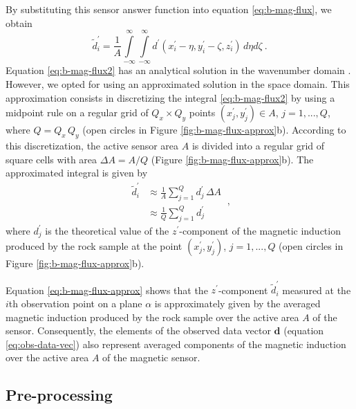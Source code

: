 \documentclass[galley,gc]{agutex}
\begin{document}
\begin{article}
\begin{equation}
\label{eq:w-function}
\end{equation}
By substituting this sensor answer function into 
equation \ref{eq:b-mag-flux}, we obtain
\begin{equation}
\tilde{d}^{\prime}_{i} = \frac{1}{A} 
\int \limits_{-\infty}^{\infty} \int \limits_{-\infty}^{\infty}
d^{\prime}(x^{\prime}_{i} - \eta, y^{\prime}_{i} - \zeta, z^{\prime}_{i}) \, d\eta d\zeta \: .
\label{eq:b-mag-flux2}
\end{equation}
Equation \ref{eq:b-mag-flux2} has an analytical solution
in the wavenumber domain \citep{egli2000}.
However, we opted for using an approximated solution in the
space domain. This approximation consists in discretizing the 
integral \ref{eq:b-mag-flux2} by using a midpoint rule on 
a regular grid of $Q_{x} \times Q_{y}$ points 
$(x^{\prime}_{j}, y^{\prime}_{j}) \in A$,
$j = 1, ..., Q$, where $Q = Q_{x} \, Q_{y}$
(open circles in Figure \ref{fig:b-mag-flux-approx}b).
According to this discretization, the active sensor area $A$ is
divided into a regular grid of square cells with area
$\Delta A = A/Q$ (Figure \ref{fig:b-mag-flux-approx}b).
The approximated integral is given by
\begin{equation}
\begin{split}
\tilde{d}^{\prime}_{i} 
&\approx \frac{1}{A} \sum \limits_{j = 1}^{Q} d^{\prime}_{j} \, \Delta A \\
&\approx \frac{1}{Q} \sum \limits_{j = 1}^{Q} d^{\prime}_{j}
\end{split} \: ,
\label{eq:b-mag-flux-approx}
\end{equation}
where $d^{\prime}_{j}$ is the theoretical value of the 
$z^{\prime}$-component of the magnetic induction produced by the rock
sample at the point $(x^{\prime}_{j}, y^{\prime}_{j})$, $j = 1, ..., Q$
(open circles in Figure \ref{fig:b-mag-flux-approx}b).

Equation \ref{eq:b-mag-flux-approx} shows that the
$z^{\prime}$-component $\tilde{d}^{\prime}_{i}$ measured at
the $i$th observation point on a plane $\alpha$ is
approximately given by the averaged magnetic induction
produced by the rock sample over the active area $A$ of the sensor.
Consequently, the elements of the observed data vector 
$\mathbf{d}$ (equation \ref{eq:obs-data-vec}) also represent
averaged components of the magnetic induction over the
active area $A$ of the magnetic sensor.

\subsection{Pre-processing}
\label{subsec:Pre-processing}


\end{article}
\end{document}
